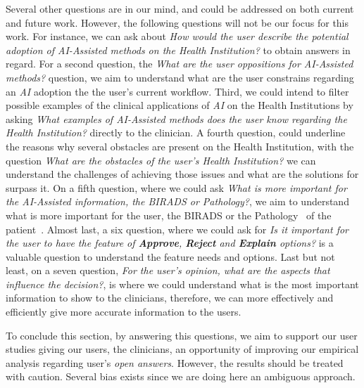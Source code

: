 Several other questions are in our mind, and could be addressed on both current and future work. However, the following questions will not be our focus for this work. For instance, we can ask about \textit{How would the user describe the potential adoption of \textit{AI-Assisted} methods on the Health Institution?} to obtain answers in regard. For a second question, the \textit{What are the user oppositions for \textit{AI-Assisted} methods?} question, we aim to understand what are the user constrains regarding an {\it AI} adoption the the user's current workflow. Third, we could intend to filter possible examples of the clinical applications of {\it AI} on the Health Institutions by asking \textit{What examples of \textit{AI-Assisted} methods does the user know regarding the Health Institution?} directly to the clinician. A fourth question, could underline the reasons why several obstacles are present on the Health Institution, with the question \textit{What are the obstacles of the user's Health Institution?} we can understand the challenges of achieving those issues and what are the solutions for surpass it. On a fifth question, where we could ask \textit{What is more important for the \textit{AI-Assisted} information, the BIRADS or Pathology?}, we aim to understand what is more important for the user, the BIRADS or the Pathology~\cite{maicas2018pre} of the patient~\cite{elverici2015nonpalpable}. Almost last, a six question, where we could ask for \textit{Is it important for the user to have the feature of \textbf{Approve}, \textbf{Reject} and \textbf{Explain} options?} is a valuable question to understand the feature needs and options. Last but not least, on a seven question, \textit{For the user's opinion, what are the aspects that influence the decision?}, is where we could understand what is the most important information to show to the clinicians, therefore, we can more effectively and efficiently give more accurate information to the users.

To conclude this section, by answering this questions, we aim to support our user studies giving our users, the clinicians, an opportunity of improving our empirical analysis regarding user's \textit{open answers}. However, the results should be treated with caution. Several bias exists since we are doing here an ambiguous approach.